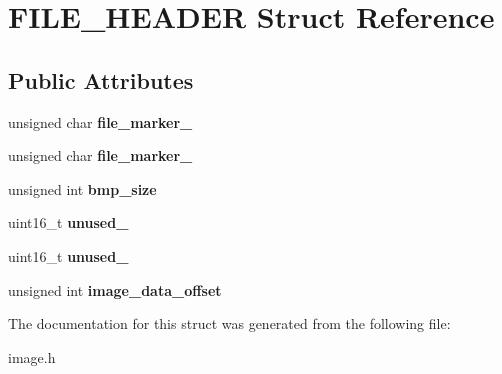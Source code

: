 \hypertarget{structFILE__HEADER}{}\section{F\+I\+L\+E\+\_\+\+H\+E\+A\+D\+ER Struct Reference}
\label{structFILE__HEADER}
\subsection*{Public Attributes}
\begin{DoxyCompactItemize}
\item 
\mbox{\label{structFILE__HEADER_a87a2e43db9fc4cb5f1782dd539327d2a}} 
unsigned char {\bfseries file\+\_\+marker\+\_}
\item 
\mbox{\label{structFILE__HEADER_a0073086bf9262ebecb2a4f022f8d387f}} 
unsigned char {\bfseries file\+\_\+marker\+\_}
\item 
\mbox{\label{structFILE__HEADER_a9df02fc8a52cb63992b422379d5e4877}} 
unsigned int {\bfseries bmp\+\_\+size}
\item 
\mbox{\label{structFILE__HEADER_a18a5fdd9aeb02a9077d2526d1552acd7}} 
uint16\+\_\+t {\bfseries unused\+\_}
\item 
\mbox{\label{structFILE__HEADER_ae4b87e7b4dcf63b1229c0f435e7e0785}} 
uint16\+\_\+t {\bfseries unused\+\_}
\item 
\mbox{\label{structFILE__HEADER_a696299b90d97e4d990f72454a42b7ef1}} 
unsigned int {\bfseries image\+\_\+data\+\_\+offset}
\end{DoxyCompactItemize}


The documentation for this struct was generated from the following file\+:\begin{DoxyCompactItemize}
\item 
image.\+h\end{DoxyCompactItemize}
